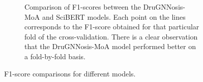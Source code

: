 \documentclass[journal,twoside,web]{ieeecolor}
\begin{document}
\begin{figure}[H]
\begin{subfigure}[H]{\linewidth}
   \caption{Comparison of F1-scores between the DruGNNosis-MoA and SciBERT models.
   Each point on the lines corresponds to the F1-score obtained for that particular fold of the cross-validation.
   There is a clear observation that the DruGNNosis-MoA model performed better on a fold-by-fold basis.}
   \label{fig:fscore1b}
\end{subfigure}
\caption{F1-score comparisons for different models.}
\label{fig:fscore1}
\end{figure}



\end{document}
